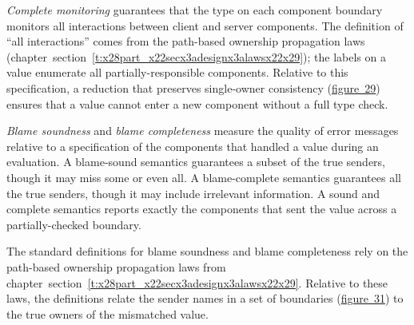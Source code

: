 \documentclass[ twoside,open=right,titlepage,numbers=noenddot,headinclude,%
                footinclude=true,cleardoublepage=empty,abstract=off,
                BCOR=5mm,paper=a4,fontsize=11pt,%
                ngerman,american,%
                parts,pdfspacing]{scrreprt}
\newcommand{\SecRef}[2]{section~#1}
\newcommand{\SecRefLocal}[3]{\hyperref[#1]{\SecRef{#2}{#3}}}
\newcommand{\FigureRef}[2]{#1}
\renewcommand{\SecRefLocal}[3]{section~\ref{#1}}
\begin{document}
\emph{Complete monitoring} guarantees that the type on each component boundary
 monitors all interactions between client and server components.
The definition of {``}all interactions{''} comes from the
 path{-}based ownership propagation laws (chapter~\SecRefLocal{t:x28part_x22secx3adesignx3alawsx22x29}{4.4.4.1}{How to lift a reduction relation});
 the labels on a value enumerate all partially{-}responsible components.
Relative to this specification, a reduction that preserves
 single{-}owner consistency (\hyperref[t:x28counter_x28x22figurex22_x22figx3asurfacex2downershipx22x29x29]{figure~\FigureRef{29}{t:x28counter_x28x22figurex22_x22figx3asurfacex2downershipx22x29x29}})
 ensures that a value cannot enter a new component without a full type check.


\emph{Blame soundness} and \emph{blame completeness} measure the quality of error messages
 relative to a specification of the components that handled a value during an
  evaluation.
A blame{-}sound semantics guarantees a subset of the true senders,
 though it may miss some or even all.
A blame{-}complete semantics guarantees all the true senders,
 though it may include irrelevant information.
A sound and complete semantics reports exactly the components that sent
 the value across a partially{-}checked boundary.

The standard definitions for blame soundness and blame completeness
 rely on the path{-}based ownership propagation laws from chapter~\SecRefLocal{t:x28part_x22secx3adesignx3alawsx22x29}{4.4.4.1}{How to lift a reduction relation}.
Relative to these laws, the definitions relate the sender names in a
 set of boundaries (\hyperref[t:x28counter_x28x22figurex22_x22figx3aevaluationx2dmetax22x29x29]{figure~\FigureRef{31}{t:x28counter_x28x22figurex22_x22figx3aevaluationx2dmetax22x29x29}}) to the true owners of
 the mismatched value.

\end{document}
